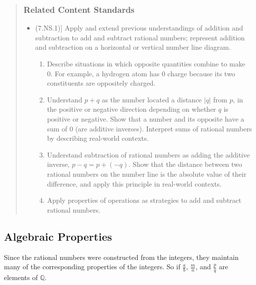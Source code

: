 \documentclass[
]{book}
\providecommand{\tightlist}{%
  \setlength{\itemsep}{0pt}\setlength{\parskip}{0pt}}
\theoremstyle{definition}
\theoremstyle{definition}
\theoremstyle{definition}
\theoremstyle{remark}
\begin{document}
\begin{quote}
\hypertarget{related-content-standards-9}{%
\subsubsection*{Related Content Standards}\label{related-content-standards-9}}

\begin{itemize}
\tightlist
\item
  (7.NS.1){]} Apply and extend previous understandings of addition and subtraction to add and subtract rational numbers; represent addition and subtraction on a horizontal or vertical number line diagram.

  \begin{enumerate}
  \def\labelenumi{\alph{enumi}.}
  \tightlist
  \item
    Describe situations in which opposite quantities combine to make 0. For example, a hydrogen atom has 0 charge because its two constituents are oppositely charged.
  \item
    Understand \(p + q\) as the number located a distance \(|q|\) from \(p\), in the positive or negative direction depending on whether \(q\) is positive or negative. Show that a number and its opposite have a sum of \(0\) (are additive inverses). Interpret sums of rational numbers by describing real-world contexts.
  \item
    Understand subtraction of rational numbers as adding the additive inverse, \(p- q = p + (-q)\). Show that the distance between two rational numbers on the number line is the absolute value of their difference, and apply this principle in real-world contexts.
  \item
    Apply properties of operations as strategies to add and subtract rational numbers.
  \end{enumerate}
\end{itemize}
\end{quote}

\hypertarget{algebraic-properties}{%
\subsection{Algebraic Properties}\label{algebraic-properties}}

Since the rational numbers were constructed from the integers, they maintain many of the corresponding properties of the integers. So if \(\frac{a}{b}\), \(\frac{m}{n}\), and \(\frac{p}{q}\) are elements of \(\mathbb{Q}\).
\end{document}
